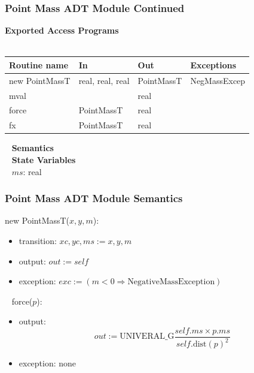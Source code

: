 \documentclass[t,12pt,numbers,fleqn]{beamer}
\begin{document}
\begin{frame}
\frametitle{Point Mass ADT Module Continued}

\textbf{Exported Access Programs}\\
~\newline
\begin{tabular}{| l | l | l | l |}
\hline
\textbf{Routine name} & \textbf{In} & \textbf{Out} & \textbf{Exceptions}\\
\hline
new PointMassT & real, real, real & PointMassT & NegMassExcep\\
\hline
mval & ~ & real & ~\\
\hline 
force & PointMassT & real & ~\\
\hline
fx & PointMassT & real & ~\\
\hline
\end{tabular}

~\newline
\textbf{Semantics}\\
~\newline
\textbf{State Variables}\\
~\newline
$ms$: real

\end{frame}


\begin{frame}
\frametitle{Point Mass ADT Module Semantics}

\noindent new PointMassT($x, y, m$):
\begin{itemize}
\item transition: $xc, yc, ms := x, y, m$
\item output: $out := \mathit{self}$
\item exception: $exc := (m < 0 \Rightarrow \mbox{NegativeMassException})$
\end{itemize}
~\newline
\noindent force($p$):
\begin{itemize}
\item output: $$out := \mathrm{UNIVERAL\_G} \frac{\mathit{self}.ms \times p.ms}
{\mathit{self}.\mathrm{dist}(p)^2}$$
\item exception: none
\end{itemize}

\end{frame}

\end{document}
